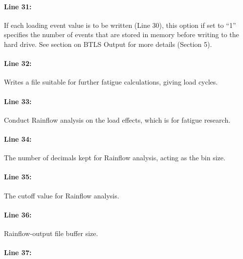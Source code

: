 \documentclass[
]{article}
\begin{document}
\paragraph*{Line 31:}\label{line-31}

If each loading event value is to be written (Line 30), this option if
set to ``1'' specifies the number of events that are stored in memory
before writing to the hard drive. See section on BTLS Output for more
details (Section 5).

\paragraph*{Line 32:}\label{line-32}

Writes a file suitable for further fatigue calculations, giving load
cycles.

\paragraph*{\texorpdfstring{Line 33: }{Line 33: }}\label{line-33}

Conduct Rainflow analysis on the load effects, which is for fatigue
research.

\paragraph*{\texorpdfstring{Line 34: }{Line 34: }}\label{line-34}

The number of decimals kept for Rainflow analysis, acting as the bin
size.

\paragraph*{\texorpdfstring{Line 35: }{Line 35: }}\label{line-35}

The cutoff value for Rainflow analysis.

\paragraph*{\texorpdfstring{Line 36: }{Line 36: }}\label{line-36}

Rainflow-output file buffer size.

\paragraph*{Line 37:}\label{line-37}
\end{document}
